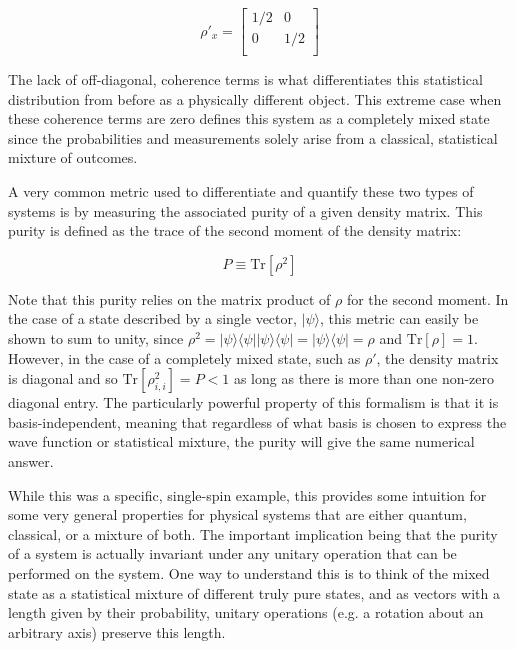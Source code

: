 \[
\rho'_x =
 \begin{bmatrix}
 1/2 & 0\\
 0 & 1/2 \\
\end{bmatrix}\]

The lack of off-diagonal, coherence terms is what differentiates this statistical distribution from before as a physically different object. This extreme case when these coherence terms are zero defines this system as a completely mixed state since the probabilities and measurements solely arise from a classical, statistical mixture of outcomes. 

A very common metric used to differentiate and quantify these two types of systems is by measuring the associated purity of a given density matrix. This purity is defined as the trace of the second moment of the density matrix: 

\begin{equation}
\label{eqn:purity}
P \equiv \mathrm{Tr} [ \rho^2]
\end{equation}

Note that this purity relies on the matrix product of $\rho$ for the second moment. In the case of a state described by a single vector, $|\psi \rangle$, this metric can easily be shown to sum to unity, since $ \rho^2 = | \psi \rangle \langle \psi | |\psi \rangle \langle \psi | = | \psi \rangle \langle \psi | = \rho$ and $\mathrm{Tr} [ \rho ] = 1$. However, in the case of a completely mixed state, such as $\rho'$, the density matrix is diagonal and so $\mathrm{Tr} [\rho_{i,i}^2]  = P < 1$ as long as there is more than one non-zero diagonal entry. The particularly powerful property of this formalism is that it is basis-independent, meaning that regardless of what basis is chosen to express the wave function or statistical mixture, the purity will give the same numerical answer\cite{nielsen2010}.

While this was a specific, single-spin example, this provides some intuition for some very general properties for physical systems that are either quantum, classical, or a mixture of both. The important implication being that the purity of a system is actually invariant under any unitary operation that can be performed on the system. One way to understand this is to think of the mixed state as a statistical mixture of different truly pure states, and as vectors with a length given by their probability, unitary operations (e.g. a rotation about an arbitrary axis) preserve this length. 


